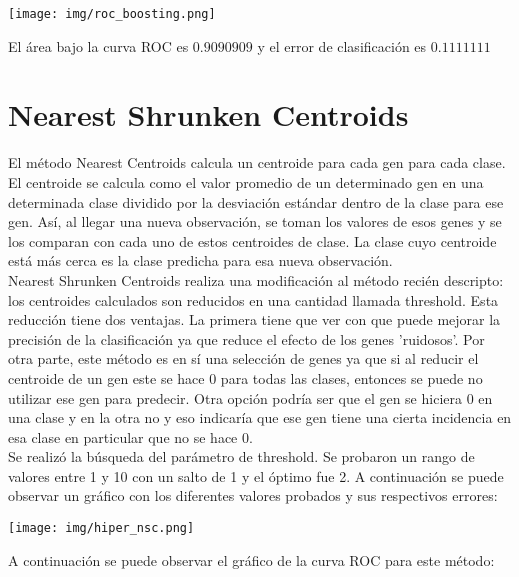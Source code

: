 \documentclass{article}
\begin{document}
\begin{center}
    \texttt{[image: img/roc\_boosting.png]}
\end{center}

\noindent
El área bajo la curva ROC es $0.9090909$ y el error de clasificación es $0.1111111$\\


\section{Nearest Shrunken Centroids}
El método Nearest Centroids calcula un centroide para cada gen para cada clase. El centroide se calcula como el valor promedio de un determinado gen en una determinada clase dividido por la desviación estándar dentro de la clase para ese gen. Así, al llegar una nueva observación, se toman los valores de esos genes y se los comparan con cada uno de estos centroides de clase. La clase cuyo centroide está más cerca es la clase predicha para esa nueva observación.\\

\noindent
Nearest Shrunken Centroids realiza una modificación al método recién descripto: los centroides calculados son reducidos en una cantidad llamada threshold. Esta reducción tiene dos ventajas. La primera tiene que ver con que puede mejorar la precisión de la clasificación ya que reduce el efecto de los genes 'ruidosos'. Por otra parte, este método es en sí una selección de genes ya que si al reducir el centroide de un gen este se hace 0 para todas las clases, entonces se puede no utilizar ese gen para predecir. Otra opción podría ser que el gen se hiciera 0 en una clase y en la otra no y eso indicaría que ese gen tiene una cierta incidencia en esa clase en particular que no se hace 0.\\

\noindent
Se realizó la búsqueda del parámetro de threshold. Se probaron un rango de valores entre 1 y 10 con un salto de 1 y el óptimo fue 2. A continuación se puede observar un gráfico con los diferentes valores probados y sus respectivos errores:\\

\begin{center}
    \texttt{[image: img/hiper\_nsc.png]}
\end{center}

\noindent
A continuación se puede observar el gráfico de la curva ROC para este método:\\
\end{document}
